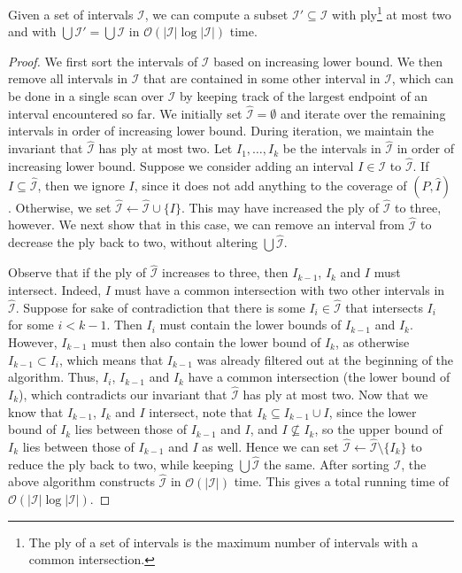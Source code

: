 \documentclass[a4paper,UKenglish,cleveref,thm-restate,notab]{lipics-v2021}
\newcommand{\bigO}{\mathcal{O}}
\newcommand{\I}{\mathcal{I}}
\begin{document}
    \begin{lemma}
    \label{lem:reducing_ply}
        Given a set of intervals $\I$, we can compute a subset $\I' \subseteq \I$ with ply\footnote{
            The ply of a set of intervals is the maximum number of intervals with a common intersection.
        } at most two and with $\bigcup \I' = \bigcup \I$ in $\bigO(|\I| \log |\I|)$ time.
    \end{lemma}
    \begin{proof}
        We first sort the intervals of $\I$ based on increasing lower bound.
        We then remove all intervals in $\I$ that are contained in some other interval in $\I$, which can be done in a single scan over $\I$ by keeping track of the largest endpoint of an interval encountered so far.
        We initially set $\hat{\I} = \emptyset$ and iterate over the remaining intervals in order of increasing lower bound.
        During iteration, we maintain the invariant that $\hat{\I}$ has ply at most two.
        Let $I_1, \dots, I_k$ be the intervals in $\hat{\I}$ in order of increasing lower bound.
        Suppose we consider adding an interval $I \in \I$ to $\hat{\I}$.
        If $I \subseteq \hat{\I}$, then we ignore $I$, since it does not add anything to the coverage of $(P, \hat{I})$.
        Otherwise, we set $\hat{\I} \gets \hat{\I} \cup \{I\}$.
        This may have increased the ply of $\hat{\I}$ to three, however.
        We next show that in this case, we can remove an interval from $\hat{\I}$ to decrease the ply back to two, without altering $\bigcup \hat{\I}$.
        
        Observe that if the ply of $\hat{\I}$ increases to three, then $I_{k-1}$, $I_k$ and $I$ must intersect.
        Indeed, $I$ must have a common intersection with two other intervals in $\hat{\I}$.
        Suppose for sake of contradiction that there is some $I_i \in \hat{\I}$ that intersects $I_i$ for some $i < k-1$.
        Then $I_i$ must contain the lower bounds of $I_{k-1}$ and $I_k$.
        However, $I_{k-1}$ must then also contain the lower bound of $I_k$, as otherwise $I_{k-1} \subset I_i$, which means that $I_{k-1}$ was already filtered out at the beginning of the algorithm.
        Thus, $I_i$, $I_{k-1}$ and $I_k$ have a common intersection (the lower bound of $I_k$), which contradicts our invariant that $\hat{\I}$ has ply at most two.
        Now that we know that $I_{k-1}$, $I_k$ and $I$ intersect, note that $I_k \subseteq I_{k-1} \cup I$, since the lower bound of $I_k$ lies between those of $I_{k-1}$ and $I$, and $I \nsubseteq I_k$, so the upper bound of $I_k$ lies between those of $I_{k-1}$ and $I$ as well.
        Hence we can set $\hat{\I} \gets \hat{\I} \setminus \{I_k\}$ to reduce the ply back to two, while keeping $\bigcup \hat{\I}$ the same.
        After sorting $\I$, the above algorithm constructs $\hat{\I}$ in $\bigO(|\I|)$ time.
        This gives a total running time of $\bigO(|\I| \log |\I|)$.
    \end{proof}
\end{document}
